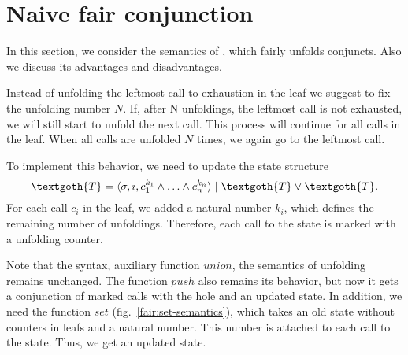 \section{Naive fair conjunction}

In this section, we consider the semantics of \mk, which fairly unfolds conjuncts. Also we discuss its advantages and disadvantages.

Instead of unfolding the leftmost call to exhaustion in the leaf we suggest to fix the unfolding number $N$.  If, after N unfoldings, the leftmost call is not exhausted, we will still start to unfold the next call. This process will continue for all calls in the leaf. When all calls are unfolded $N$ times, we again go to the leftmost call.

To implement this behavior, we need to update the state structure
\[
\textgoth{T} = \inbr{\sigma, i, c_1^{k_1} \land \ldots \land c_n^{k_n}} \mid \textgoth{T} \lor \textgoth{T}.
\]
For each call $c_i$ in the leaf, we added a natural number $k_i$, which defines the remaining number of unfoldings. Therefore, each call to the state is marked with a unfolding counter. 

Note that the syntax, auxiliary function $union$, the semantics of unfolding remains unchanged. The function $push$ also remains its behavior, but now it gets a conjunction of marked calls with the hole and an updated state. In addition, we need the function $set$ (fig.~\ref{fair:set-semantics}), which takes an old state without counters in leafs and a natural number. This number is attached to each call to the state. Thus, we get an updated state. 

